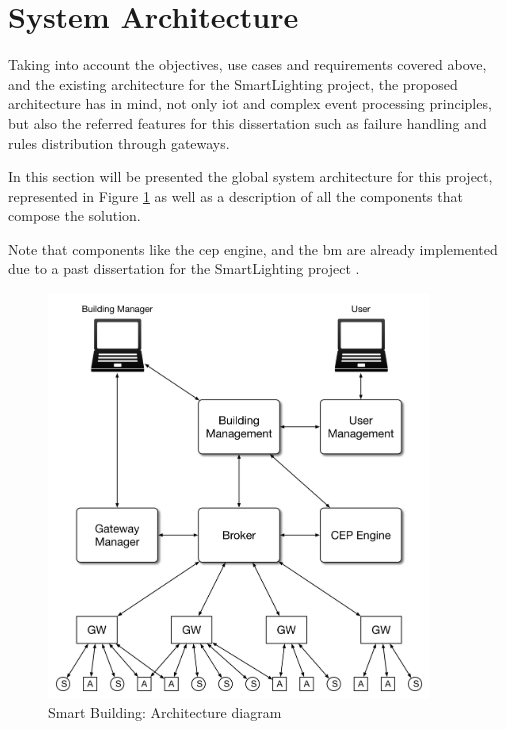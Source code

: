 \section{System Architecture}
\label{Architecture:Architecture}


Taking into account the objectives, use cases and requirements covered above, and the existing architecture for the SmartLighting project, the proposed architecture has in mind, not only \ac{iot} and complex event processing principles, but also the referred features for this dissertation such as failure handling and rules distribution through gateways.

In this section will be presented the global system architecture for this project, represented in Figure \ref{fig:arch} as well as a description of all the components that compose the solution.

Note that components like the \ac{cep} engine, and the \ac{bm} are already implemented due to a past dissertation for the SmartLighting project \cite{helder}.

\begin{figure}[H]
	\centering
	\includegraphics[width=0.9\textwidth]{figures/architecture.png}
	\caption{Smart Building: Architecture diagram}
	\label{fig:arch}
\end{figure}



